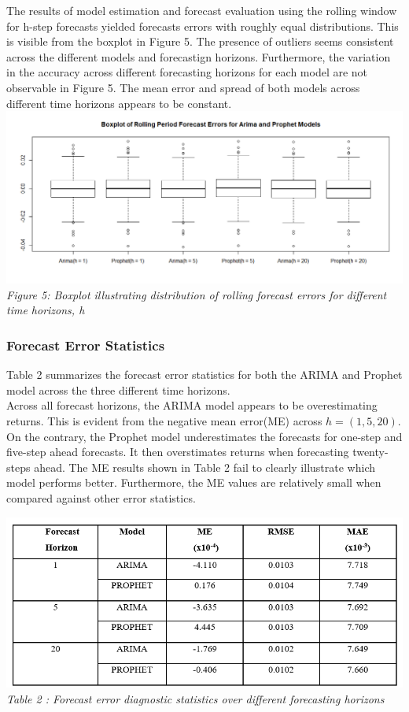 \documentclass[12pt,a4paper]{article}
\numberwithin{equation}{section}
\numberwithin{figure}{section}
\numberwithin{table}{section}
\begin{document}
The results of model estimation and forecast evaluation using the
rolling window for h-step forecasts yielded forecasts errors with
roughly equal distributions. This is visible from the boxplot in Figure
5. The presence of outliers seems consistent across the different models
and forecastign horizons. Furthermore, the variation in the accuracy
across different forecasting horizons for each model are not observable
in Figure 5. The mean error and spread of both models across different
time horizons appears to be constant.
\includegraphics[width=1.05000\textwidth]{Forecast error boxplot.png}\\
\emph{Figure 5: Boxplot illustrating distribution of rolling forecast
errors for different time horizons, h}

\subsubsection{Forecast Error
Statistics}\label{forecast-error-statistics}

Table 2 summarizes the forecast error statistics for both the ARIMA and
Prophet model across the three different time horizons.\\
Across all forecast horizons, the ARIMA model appears to be
overestimating returns. This is evident from the negative mean error(ME)
across \(h = (1,5,20)\). On the contrary, the Prophet model
underestimates the forecasts for one-step and five-step ahead forecasts.
It then overstimates returns when forecasting twenty-steps ahead. The ME
results shown in Table 2 fail to clearly illustrate which model performs
better. Furthermore, the ME values are relatively small when compared
against other error statistics.

\includegraphics[width=1.00000\textwidth]{error stats.png}\\
\emph{Table 2 : Forecast error diagnostic statistics over different
forecasting horizons}
\end{document}
